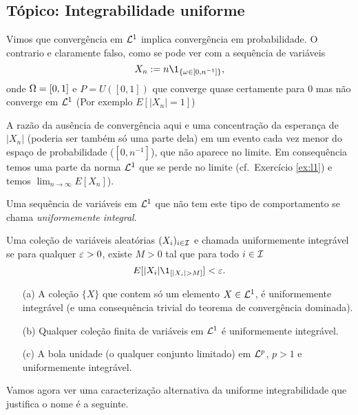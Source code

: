 \begin{topics}
\section{Tópico: Integrabilidade uniforme}

Vimos que convergência em ${\mathcal L}^1$ implica convergência em probabilidade.
O contrario e claramente falso, como se pode ver com a sequência de variáveis
$$X_n:= n\1_{\{\go \in [0,n^{-1}]\}},$$
onde $\Omega=[0,1]$ e $P=U([0,1])$ que converge quase certamente para $0$ mas não converge em ${\mathcal L}^1$ (Por exemplo $E[|X_n|=1]$)

\medskip

A razão da ausência de convergência aqui e uma concentração da esperança de $|X_n|$  (poderia ser também só uma parte dela)
em um evento cada vez menor do espaço de probabilidade ($[0,n^{-1}]$), que não aparece no limite. Em consequência
temos uma parte da norma ${\mathcal L}^1$ que se perde no limite
(cf.\ Exercício \ref{ex:l1}) e temos $\lim_{n\to \infty} E[X_n]$).

\medskip

Uma sequência de variáveis em ${\mathcal L}^1$ que não tem este tipo de comportamento se chama \textsl{uniformemente integral}.

\begin{definition}
 Uma coleção de variáveis aleatórias $(X_i)_{i\in {\ensuremath{\mathcal I}}}$ e chamada uniformemente integrável se
 para qualquer $\varepsilon>0$, existe $M>0$ tal que
 para todo $i\in {\ensuremath{\mathcal I}}$
 \begin{equation}
  E[|X_{i}|\1_{[|X_i|>M]}]<\gep.
 \end{equation}
\end{definition}


\begin{example}
 \begin{itemize}
  \item [(a)] A coleção $\{X\}$ que contem só um elemento $X\in {\ensuremath{\mathcal L}}^1$, é uniformemente integrável (e uma consequência trivial do teorema de convergência dominada).
  \item [(b)] Qualquer coleção finita de variáveis em ${\mathcal L}^1$ é uniformemente integrável.
  \item [(c)] A bola unidade (o qualquer conjunto limitado) em ${\mathcal L}^p$, $p>1$ e uniformemente integrável.
 \end{itemize}
\end{example}

Vamos agora ver uma caracterização alternativa da uniforme integrabilidade que justifica o nome é a seguinte.


\end{topics}
